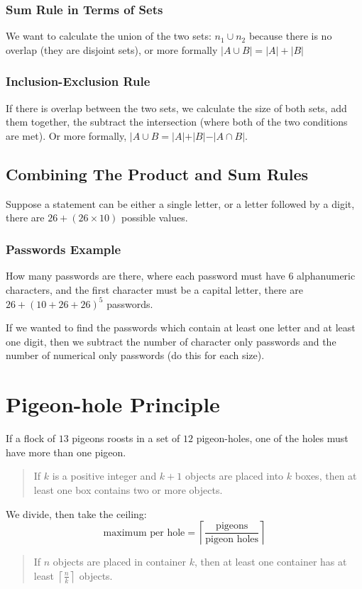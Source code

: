 \subsubsection{Sum Rule in Terms of Sets}\label{ssub:sum_rule_in_terms_of_sets}

We want to calculate the union of the two sets: \(n_1 \cup n_2\) because there is no overlap (they are disjoint sets), or more formally \(|A \cup B|=|A|+|B|\)

\subsubsection{Inclusion-Exclusion Rule}\label{ssub:inclusion_exclusion_rule}

If there is overlap between the two sets, we calculate the size of both sets, add them together, the subtract the intersection (where both of the two conditions are met).
Or more formally, \(|A \cup B = |A| + |B| - |A \cap B|\).

\subsection{Combining The Product and Sum Rules}\label{sub:combining_the_product_and_sum_rules}

Suppose a statement can be either a single letter, or a letter followed by a digit, there are \(26 + (26\times 10)\) possible values.

\subsubsection{Passwords Example}\label{ssub:passwords_example}

How many passwords are there, where each password must have \(6\) alphanumeric characters, and the first character must be a capital letter, there are \(26 + (10 + 26 + 26)^5\) passwords.

\begin{note}
    If we wanted to find the passwords which contain at least one letter and at least one digit, then we subtract the number of character only passwords and the number of numerical only passwords (do this for each size).
\end{note}

\section{Pigeon-hole Principle}\label{sec:pigeon_hole_principle}

If a flock of \(13\) pigeons roosts in a set of \(12\) pigeon-holes, one of the holes must have more than one pigeon.
\begin{quote}
    If \(k\) is a positive integer and \(k+1\) objects are placed into \(k\) boxes, then at least one box contains two or more objects.
\end{quote}
We divide, then take the ceiling:
\[
    \text{maximum per hole}= \left\lceil \frac{\text{pigeons}}{\text{pigeon holes}} \right\rceil
\]
\begin{quote}
    If \(n\) objects are placed in container \(k\), then at least one container has at least \(\left\lceil \frac{n}{k} \right\rceil \) objects.
\end{quote}
